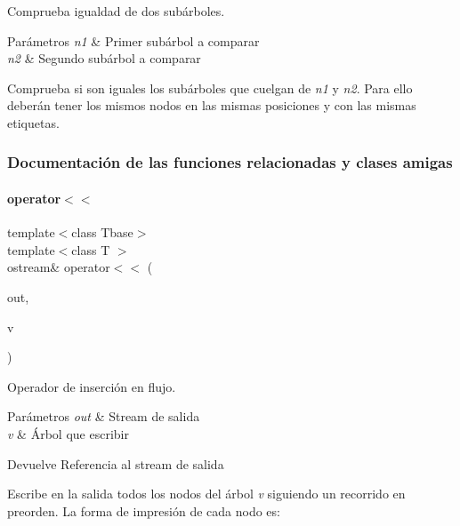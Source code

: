 Comprueba igualdad de dos subárboles. 


\begin{DoxyParams}{Parámetros}
{\em n1} & Primer subárbol a comparar \\
\hline
{\em n2} & Segundo subárbol a comparar\\
\hline
\end{DoxyParams}
Comprueba si son iguales los subárboles que cuelgan de {\itshape n1} y {\itshape n2}. Para ello deberán tener los mismos nodos en las mismas posiciones y con las mismas etiquetas. 

\subsubsection{Documentación de las funciones relacionadas y clases amigas}
\hypertarget{classArbolGeneral_a2b19e120d650b0363eed1bfd8c7f5351}{}\label{classArbolGeneral_a2b19e120d650b0363eed1bfd8c7f5351} 
\paragraph{\texorpdfstring{operator$<$$<$}{operator<<}}
{\footnotesize\ttfamily template$<$class Tbase$>$ \\
template$<$class T $>$ \\
ostream\& operator$<$$<$ (\begin{DoxyParamCaption}\item[{ostream \&}]{out,  }\item[{const \hyperlink{classArbolGeneral}{Arbol\+General}$<$ T $>$ \&}]{v }\end{DoxyParamCaption})\hspace{0.3cm}{\ttfamily [friend]}}



Operador de inserción en flujo. 


\begin{DoxyParams}{Parámetros}
{\em out} & Stream de salida \\
\hline
{\em v} & Árbol que escribir \\
\hline
\end{DoxyParams}
\begin{DoxyReturn}{Devuelve}
Referencia al stream de salida
\end{DoxyReturn}
Escribe en la salida todos los nodos del árbol {\itshape v} siguiendo un recorrido en preorden. La forma de impresión de cada nodo es\+:



